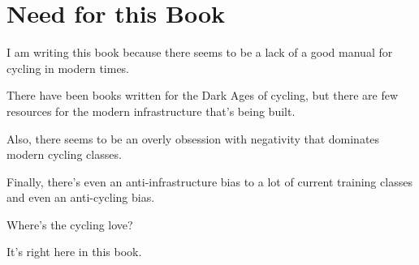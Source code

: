 \chapter{Need for this Book}

I am writing this book because there seems to be a lack of a good manual for cycling in 
modern times.

There have been books written for the Dark Ages of cycling, but there are few
resources for the modern infrastructure that's being built. 

Also, there seems to be an overly obsession with negativity that dominates modern cycling classes.

Finally, there's even an anti-infrastructure bias to a lot of current training classes and even an anti-cycling bias.

Where's the cycling love?

It's right here in this book. 

